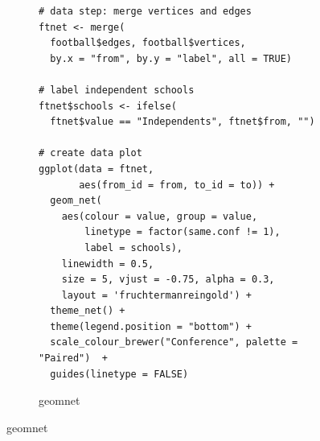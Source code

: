 \begin{figure}[hbtp]
\begin{subfigure}[t]{\textwidth}
\begin{adjustbox}{valign=t}
\begin{minipage}{.49\textwidth}
                          \end{minipage}

                          \end{adjustbox}
\end{subfigure}
%
\begin{subfigure}[t]{\textwidth}
\caption{geomnet}\vspace{-.5cm}
\vspace{1em}

             \begin{adjustbox}{valign=t}

             \begin{minipage}{.49\textwidth}
 \begin{knitrout}\footnotesize
{}\color{fgcolor}\begin{kframe}
\begin{verbatim}
# data step: merge vertices and edges
ftnet <- merge(
  football$edges, football$vertices,
  by.x = "from", by.y = "label", all = TRUE)

# label independent schools
ftnet$schools <- ifelse(
  ftnet$value == "Independents", ftnet$from, "")

# create data plot
ggplot(data = ftnet,
       aes(from_id = from, to_id = to)) +
  geom_net(
    aes(colour = value, group = value,
        linetype = factor(same.conf != 1),
        label = schools),
    linewidth = 0.5,
    size = 5, vjust = -0.75, alpha = 0.3,
    layout = 'fruchtermanreingold') +
  theme_net() +
  theme(legend.position = "bottom") +
  scale_colour_brewer("Conference", palette = "Paired")  +
  guides(linetype = FALSE)
\end{verbatim}
\end{kframe}
\end{knitrout} \vspace{1em}

                   \end{minipage}

                  \begin{minipage}{.49\textwidth}


\end{minipage}
\end{adjustbox}
\end{subfigure}
\end{figure}
